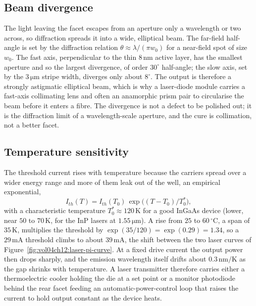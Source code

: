 \subsection{Beam divergence}

The light leaving the facet escapes from an aperture only a wavelength or
two across, so diffraction spreads it into a wide, elliptical beam. The
far-field half-angle is set by the diffraction relation $\theta \approx
\lambda/(\pi w_{0})$ for a near-field spot of size $w_{0}$. The fast axis,
perpendicular to the thin $8\,\si{\nano\meter}$ active layer, has the
smallest aperture and so the largest divergence, of order $30^{\circ}$
half-angle; the slow axis, set by the $3\,\si{\micro\meter}$ stripe
width, diverges only about $8^{\circ}$. The output is therefore a
strongly astigmatic elliptical beam, which is why a laser-diode module
carries a fast-axis collimating lens and often an anamorphic prism pair
to circularise the beam before it enters a fibre. The divergence is not a
defect to be polished out; it is the diffraction limit of a
wavelength-scale aperture, and the cure is collimation, not a better
facet.

\subsection{Temperature sensitivity}

The threshold current rises with temperature because the carriers spread
over a wider energy range and more of them leak out of the well, an
empirical exponential,
\[
I_{th}(T) = I_{th}(T_0)\,\exp\!\big((T - T_0)/T_0^{*}\big),
\]
with a characteristic temperature $T_0^{*} \approx 120\,\si{\kelvin}$
for a good InGaAs device (lower, near $50$ to $70\,\si{\kelvin}$, for
the InP lasers at $1.55\,\si{\micro\meter}$). A rise from $25$ to
$60\,{}^{\circ}\mathrm{C}$, a span of $35\,\si{\kelvin}$, multiplies the
threshold by $\exp(35/120) = \exp(0.29) = 1.34$, so a $29\,\si{\milli
\ampere}$ threshold climbs to about $39\,\si{\milli\ampere}$, the shift
between the two laser curves of
Figure~\ref{fig:vol04ch12:laser-pi-curve}. At a fixed drive current the
output power then drops sharply, and the emission wavelength itself
drifts about $0.3\,\si{\nano\meter\per\kelvin}$ as the gap shrinks with
temperature. A laser transmitter therefore carries either a
thermoelectric cooler holding the die at a set point or a monitor
photodiode behind the rear facet feeding an automatic-power-control loop
that raises the current to hold output constant as the device heats.

